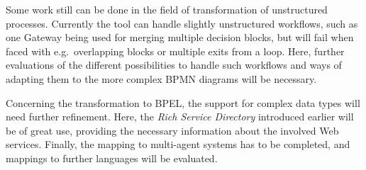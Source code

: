 Some work still can be done in the field of transformation of unstructured processes.  Currently the tool can handle slightly unstructured workflows, such as one Gateway being used for merging multiple decision blocks, but will fail when faced with e.g.\ overlapping blocks or multiple exits from a loop.  Here, further evaluations of the different possibilities to handle such workflows and ways of adapting them to the more complex BPMN diagrams will be necessary.

Concerning the transformation to BPEL, the support for complex data types will need further refinement.  Here, the \emph{Rich Service Directory} introduced earlier will be of great use, providing the necessary information about the involved Web services.  Finally, the mapping to multi-agent systems has to be completed, and mappings to further languages will be evaluated.
